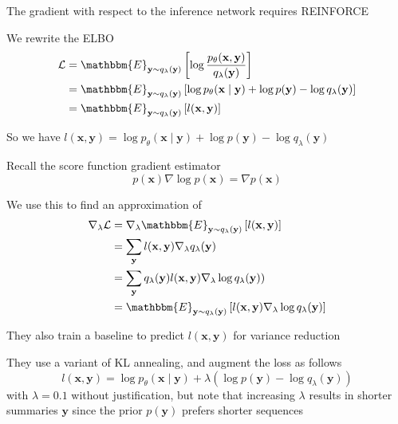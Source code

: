 \documentclass{beamer}
\let\tempone\itemize
\let\temptwo\enditemize
\renewenvironment{itemize}{\tempone\addtolength{\itemsep}{0.5\baselineskip}}{\temptwo}
\newcommand{\E}[2]{\mathbbm{E}_{#1}\left[#2\right]}
\newcommand{\bx}{\mathbf{x}}
\newcommand{\by}{\mathbf{y}}
\begin{document}
\begin{frame}
\begin{center}
\end{center}
\begin{itemize}
\item The gradient with respect to the inference network requires REINFORCE
\item We rewrite the ELBO
\begin{align}
\mathcal{L} &= \E{\by\sim q_\lambda(\by)}{\log \frac{p_\theta(\bx,\by)}{q_\lambda(\by)}}\\
&= \E{\by\sim q_\lambda(\by)}{\log p_\theta(\bx\mid\by) + \log p(\by) - \log q_\lambda(\by)}\\
&= \E{\by\sim q_\lambda(\by)}{l(\bx,\by)}
\end{align}
\item So we have $l(\bx, \by) = \log p_\theta(\bx\mid\by) + \log p(\by) - \log q_\lambda(\by)$
\end{itemize}
\end{frame}

\begin{frame}
\begin{center}
\end{center}
\begin{itemize}
\item Recall the score function gradient estimator
\begin{equation}
p(\bx)\nabla \log p(\bx) = \nabla p(\bx)
\end{equation}
\item We use this to find an approximation of 
\begin{align}
\nabla_\lambda \mathcal{L} &= \nabla_\lambda\E{\by\sim q_\lambda(\by)}{l(\bx,\by)}\\
&= \sum_\by l(\bx,\by)\nabla_\lambda q_\lambda(\by)\\
&= \sum_\by q_\lambda(\by)l(\bx,\by)\nabla_\lambda\log q_\lambda(\by) )\\
&= \E{\by\sim q_\lambda(\by)}{l(\bx,\by) \nabla_\lambda\log q_\lambda(\by)}
\end{align}
\end{itemize}
\end{frame}

\begin{frame}
\begin{center}
\end{center}
\begin{itemize}
\item They also train a baseline to predict $l(\bx,\by)$ for variance reduction
\item They use a variant of KL annealing, and augment the loss as follows
$$l(\bx, \by) = \log p_\theta(\bx\mid\by) + \lambda(\log p(\by) - \log q_\lambda(\by))$$
with $\lambda = 0.1$ without justification, but note that increasing $\lambda$ results
in shorter summaries $\by$ since the prior $p(\by)$ prefers shorter sequences
\end{itemize}
\end{frame}
\end{document}
